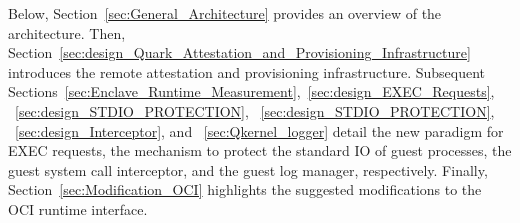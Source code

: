 Below, Section~\ref{sec:General_Architecture} provides an overview of the architecture. Then, Section~\ref{sec:design_Quark_Attestation_and_Provisioning_Infrastructure} introduces the remote attestation and provisioning infrastructure. Subsequent Sections~\ref{sec:Enclave_Runtime_Measurement},~\ref{sec:design_EXEC_Requests},
~\ref{sec:design_STDIO_PROTECTION}, ~\ref{sec:design_STDIO_PROTECTION}, ~\ref{sec:design_Interceptor}, and ~\ref{sec:Qkernel_logger} detail the new paradigm for EXEC requests, the mechanism to protect the standard IO of guest processes, the guest system call interceptor, and the guest log manager, respectively. 
Finally, Section~\ref{sec:Modification_OCI} highlights the suggested modifications to the OCI runtime interface.







 

